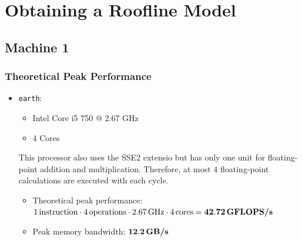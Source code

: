 
\lstset{
	basicstyle=\small,
	language=C
}

\section{Obtaining a Roofline Model}

\subsection{Machine 1}

\subsubsection{Theoretical Peak Performance}
\begin{itemize}
	\item \texttt{earth}:
	\begin{itemize}
		\item Intel Core i5 750 @ 2.67 GHz
		\item 4 Cores
	\end{itemize}
	This processor also uses the SSE2 extensio but has only one unit for floating-point addition and multiplication. Therefore, at most 4 floating-point calculations are executed with each cycle.
	\begin{itemize}
		\item Theoretical peak performance: \\
		$1 \, \text{instruction} \cdot 4 \, \text{operations} \cdot 2.67 \, \text{GHz} \cdot 4 \, \text{cores} = \bold{42.72 \, \textbf{GFLOPS/s}}$
		
		\item Peak memory bandwidth: $\bold{12.2} \, \textbf{GB/s}$ \\
	\end{itemize}
\end{itemize}


